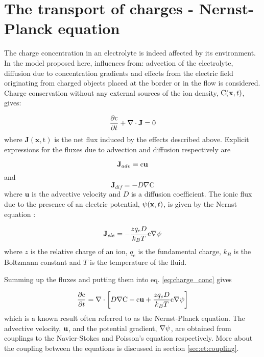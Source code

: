 \section{The transport of charges - Nernst-Planck equation}\label{sec:et:np}
The charge concentration in an electrolyte is indeed affected by its
environment. In the model proposed here, influences from: advection of
the electrolyte, diffusion due to concentration gradients and effects
from the electric field originating from charged objects placed at the
border or in the flow is considered. Charge conservation without any
external sources of the ion density, $\mathrm{C}(\mathbf{x}, t)$, gives:

\begin{equation}\label{eq:charge_conc}
\dfrac{\partial \mathrm{c}}{\partial t} + \nabla \cdot \mathbf{J} = 0
\end{equation}
where $\mathbf{J(\mathbf{x}, \mathrm{t})}$ is the net flux induced
by the effects described above. Explicit expressions for the fluxes
due to advection and diffusion respectively are 

\begin{equation}
\mathbf{J}_{adv} =
\mathrm{c}\mathbf{u}
\end{equation}
and 
\begin{equation}
\mathbf{J}_{dif} = -D\nabla \mathrm{C} 
\end{equation}
where $\mathbf{u}$ is the advective velocity and $D$ is a diffusion
coefficient. The ionic flux due to the presence of an electric
potential, $\mathrm{\psi}(\mathbf{x}, t)$, is given by the Nernst equation
\cite{dongquing-ren-book}:

\begin{equation}
\mathbf{J}_{ele} = -\frac{zq_eD}{k_BT}\mathrm{c}\nabla\mathrm{\psi}
\end{equation}
where $z$ is the relative charge of an ion, $q_e$ is the fundamental
charge, $k_B$ is the Boltzmann constant and $T$ is the temperature of the
fluid.

Summing up the fluxes and putting them into eq. \eqref{eq:charge_conc}
gives

\begin{equation}\label{eq:et:np}
\dfrac{\partial \mathrm{c}}{\partial t} = \nabla \cdot \left [
 D\nabla \mathrm{C} - \mathrm{c}\mathbf{u} + \frac{zq_eD}{k_BT}\mathrm{c}\nabla\mathrm{\psi}
\right]
\end{equation}
which is a known result often referred to as the Nernst-Planck
equation. The advective velocity, $\mathbf{u}$, and the potential gradient,
$\nabla \mathrm{\psi}$, are obtained from couplings to the Navier-Stokes and
Poisson's equation respectively. More about the coupling between the
equations is discussed in section \ref{sec:et:coupling}.


